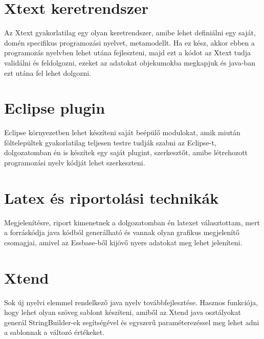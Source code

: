 \section{Xtext keretrendszer}
Az Xtext gyakorlatilag egy olyan keretrendszer, amibe lehet definiálni egy saját, domén specifikus programozási nyelvet, metamodellt. Ha ez kész, akkor ebben a programozás nyelvben lehet utána fejleszteni, majd ezt a kódot az Xtext tudja validálni és feldolgozni, ezeket az adatokat objekumokba megkapjuk és java-ban ezt utána fel lehet dolgozni.

\section{Eclipse plugin}
Eclipse környezetben lehet készíteni saját beépülő modulokat, amik miután föltelepültek gyakorlatilag teljesen testre tudják szabni az Eclipse-t, dolgozatomban én is készítek egy saját plugint, szerkesztőt, amibe létrehozott programozási nyelv kódját lehet szerkeszteni.

\section{Latex és riportolási technikák}
Megjelenítésre, riport kimenetnek a dolgozatomban én latexet választottam, mert a forráskódja java kódból generálható és vannak olyan grafikus megjelenítő csomagjai, amivel az Essbase-ből kijövő nyers adatokat meg lehet jeleníteni.

\section{Xtend}
Sok új nyelvi elemmel rendelkező java nyelv továbbfejlesztése. Hasznos funkciója, hogy lehet olyan szöveg sablont készíteni, amiből az Xtend java osztályokat generál StringBuilder-ek segítségével és egyszerű paraméterezéssel meg lehet adni a sablonnak a változó értékeket.

